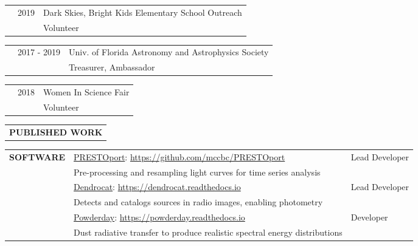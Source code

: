 \documentclass{article}
\begin{document}
\vspace{0.25cm}
\begin{tabular}{p{4cm}p{2.2cm}l}
    &2019 & Dark Skies, Bright Kids Elementary School Outreach \\
    &             & \small Volunteer
\end{tabular}

\vspace{0.25cm}
\begin{tabular}{p{4cm}p{2.2cm}l}
    &2017 - 2019 & Univ. of Florida Astronomy and Astrophysics Society \\
    &             & \small Treasurer, Ambassador
\end{tabular}

\vspace{0.25cm}
\begin{tabular}{p{4cm}p{2.2cm}l}
    &2018 & Women In Science Fair \\
    &             & \small Volunteer
\end{tabular}
\vspace{0.5cm}

\renewcommand\refname{\vskip -1cm}
\nocite{*}


\begin{tabular}{p{4cm}}
   \large{\textbf{PUBLISHED WORK}} \vspace{-0.45cm}\\
\end{tabular}

\hspace{4.6cm}\begin{minipage}{\dimexpr\textwidth-5.2cm}

\xdef\tpd{\the\prevdepth}
\end{minipage}
\vspace{0.5cm}


\thispagestyle{empty}


\begin{tabular}{p{4cm}ll}
    \large{\textbf{SOFTWARE}} &\href{https://github.com/mccbc/PRESTOport}{PRESTOport}: \href{https://github.com/mccbc/PRESTOport}{https://github.com/mccbc/PRESTOport} &  Lead Developer\\
    &\small Pre-processing and resampling light curves for time series analysis & \vspace{0.25cm} \\
    &\href{https://github.com/cmcclellan1010/dendrocat
}{Dendrocat}: \href{https://dendrocat.readthedocs.io}{https://dendrocat.readthedocs.io} & Lead Developer \\
    &\small Detects and catalogs sources in radio images, enabling photometry & \vspace{0.25cm} \\
    &\href{https://powderday.readthedocs.io/en/latest/index.html}{Powderday}: \href{https://powderday.readthedocs.io/en/latest/index.html}{https://powderday.readthedocs.io} & Developer \\ 
    &\small Dust radiative transfer to produce realistic spectral energy distributions & \\
\end{tabular}
\vspace{0.5cm}
\end{document}
